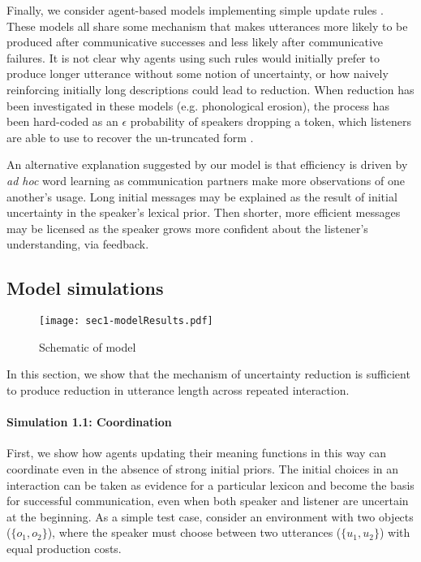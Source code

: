 Finally, we consider agent-based models implementing simple update rules \cite{steels_self-organizing_1995,barr_establishing_2004,young_evolution_2015}.
These models all share some mechanism that makes utterances more likely to be produced after communicative successes and less likely after communicative failures.
It is not clear why agents using such rules would initially prefer to produce longer utterance without some notion of uncertainty, or how naively reinforcing initially long descriptions could lead to reduction.%
When reduction has been investigated in these models (e.g. phonological erosion), the process has been hard-coded as an $\epsilon$ probability of speakers dropping a token, which listeners are able to use to recover the un-truncated form \cite{beuls2013agent,steels2016agent}.

An alternative explanation suggested by our model is that efficiency is driven by \emph{ad hoc} word learning as communication partners make more observations of one another's usage. 
Long initial messages may be explained as the result of initial uncertainty in the speaker's lexical prior.
Then shorter, more efficient messages may be licensed as the speaker grows more confident about the listener's understanding, via feedback.

\subsection{Model simulations}

\begin{figure*}
\centering
    \texttt{[image: sec1-modelResults.pdf]}
  \caption{Schematic of model}
  \label{fig:sec1model}
\end{figure*}


In this section, we show that the mechanism of uncertainty reduction is sufficient to produce reduction in utterance length across repeated interaction.
\paragraph{Simulation 1.1: Coordination}

First, we show how agents updating their meaning functions in this way can coordinate even in the absence of strong initial priors. 
The initial choices in an interaction can be taken as evidence for a particular lexicon and become the basis for successful communication, even when both speaker and listener are uncertain at the beginning.
As a simple test case, consider an environment with two objects ($\{o_1, o_2\}$), where the speaker must choose between two utterances ($\{u_1, u_2\}$) with equal production costs. 

